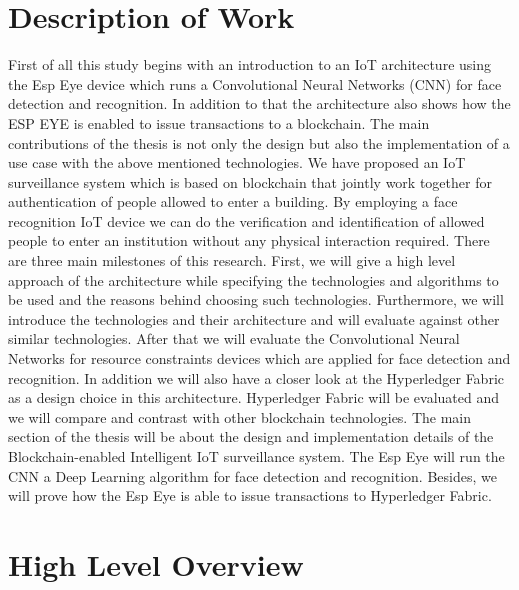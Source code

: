\section{Description of Work}
First of all this study begins with an introduction to an IoT architecture using the Esp Eye device which runs a Convolutional Neural Networks (CNN) for face detection and recognition. In addition to that the architecture also shows how the ESP EYE is enabled to issue transactions to a blockchain. The main contributions of the thesis is not only the design but also the implementation of a use case with the above mentioned technologies. We have proposed an IoT surveillance system which is based on blockchain that jointly work together for authentication of people allowed to enter a building. By employing a face recognition IoT device we can do the verification and identification of allowed people to enter an institution without any physical interaction required. There are three main milestones of this research. First, we will give a high level approach of the architecture while specifying the technologies and algorithms to be used and the reasons behind choosing such technologies. Furthermore, we will introduce the technologies and their architecture and will evaluate against other similar technologies. After that we will evaluate the Convolutional Neural Networks for resource constraints devices which are applied for face detection and recognition. In addition we will also have a closer look at the Hyperledger Fabric as a design choice in this architecture. Hyperledger Fabric will be evaluated and we will compare and contrast with other blockchain technologies. 
The main section of the thesis will be about the design and implementation details of the Blockchain-enabled Intelligent IoT surveillance system. The Esp Eye will run the CNN a Deep Learning algorithm for face detection and recognition. Besides, we will prove how the Esp Eye is able to issue transactions to Hyperledger Fabric. 



\section{High Level Overview}


